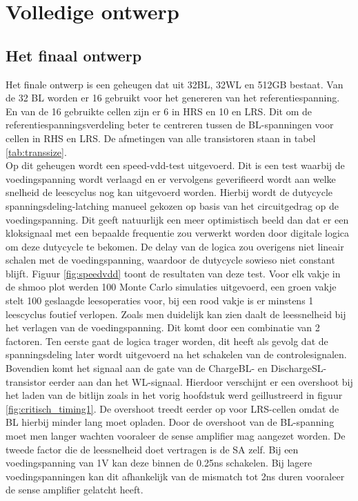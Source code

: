 \chapter{Volledige ontwerp}
\label{final}
\section{Het finaal ontwerp}
Het finale ontwerp is een geheugen dat uit 32BL, 32WL en 512GB bestaat. Van de 32 BL worden er 16 gebruikt voor het genereren van het referentiespanning. En van de 16 gebruikte cellen zijn er 6 in HRS en 10 en LRS. Dit om de referentiespanningsverdeling beter te centreren tussen de BL-spanningen voor cellen in RHS en LRS. De afmetingen van alle transistoren staan in tabel \ref{tab:transsize}. \\
Op dit geheugen wordt een speed-vdd-test uitgevoerd. Dit is een test waarbij de voedingspanning wordt verlaagd en er vervolgens geverifieerd wordt aan welke snelheid de leescyclus nog kan uitgevoerd worden. Hierbij wordt de dutycycle spanningsdeling-latching manueel gekozen op basis van het circuitgedrag op de voedingspanning. Dit geeft natuurlijk een meer optimistisch beeld dan dat er een kloksignaal met een bepaalde frequentie zou verwerkt worden door digitale logica om deze dutycycle te bekomen. De delay van de logica zou overigens niet lineair schalen met de voedingspanning, waardoor de dutycycle sowieso niet constant blijft. Figuur \ref{fig:speedvdd} toont de resultaten van deze test. Voor elk vakje in de shmoo plot werden 100 Monte Carlo simulaties uitgevoerd, een groen vakje stelt 100 geslaagde leesoperaties voor, bij een rood vakje is er minstens 1 leescyclus foutief verlopen. Zoals men duidelijk kan zien  daalt de leessnelheid bij het verlagen van de voedingspanning. Dit komt door een combinatie van 2 factoren. Ten eerste gaat de logica trager worden, dit heeft als gevolg dat de spanningsdeling later wordt uitgevoerd na het schakelen van de controlesignalen. Bovendien komt het signaal aan de gate van de ChargeBL- en DischargeSL-transistor eerder aan dan het WL-signaal. Hierdoor verschijnt er een overshoot bij het laden van de bitlijn zoals in het vorig hoofdstuk werd geillustreerd in figuur \ref{fig:critisch_timing1}. De overshoot treedt eerder op voor LRS-cellen omdat de BL hierbij minder lang moet opladen. Door de overshoot van de BL-spanning moet men langer wachten vooraleer de sense amplifier mag aangezet worden. De tweede factor die de leessnelheid doet vertragen is de SA zelf. Bij een voedingspanning van 1V kan deze binnen de 0.25ns schakelen. Bij lagere voedingspanningen kan dit afhankelijk van de mismatch tot 2ns duren vooraleer de sense amplifier gelatcht heeft.


